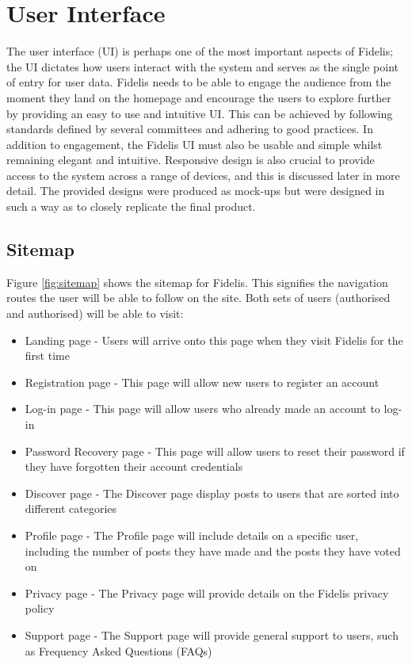 \section{User Interface}
The user interface (UI) is perhaps one of the most important aspects of Fidelis; the UI dictates how users interact with the system and serves as the single point of entry for user data. Fidelis needs to be able to engage the audience from the moment they land on the homepage and encourage the users to explore further by providing an easy to use and intuitive UI. This can be achieved by following standards defined by several committees and adhering to good practices. In addition to engagement, the Fidelis UI must also be usable and simple whilst remaining elegant and intuitive. Responsive design is also crucial to provide access to the system across a range of devices, and this is discussed later in more detail. The provided designs were produced as mock-ups but were designed in such a way as to closely replicate the final product.

\subsection{Sitemap}
Figure \ref{fig:sitemap} shows the sitemap for Fidelis. This signifies the navigation routes the user will be able to follow on the site. Both sets of users (authorised and authorised) will be able to visit:
\begin{itemize}
\item Landing page - Users will arrive onto this page when they visit Fidelis for the first time
\item Registration page - This page will allow new users to register an account
\item Log-in page - This page will allow users who already made an account to log-in 
\item Password Recovery page - This page will allow users to reset their password if they have forgotten their account credentials
\item Discover page - The Discover page display posts to users that are sorted into different categories
\item Profile page - The Profile page will include details on a specific user, including the number of posts they have made and the posts they have voted on
\item Privacy page - The Privacy page will provide details on the Fidelis privacy policy
\item Support page - The Support page will provide general support to users, such as Frequency Asked Questions (FAQs)
\end{itemize}

